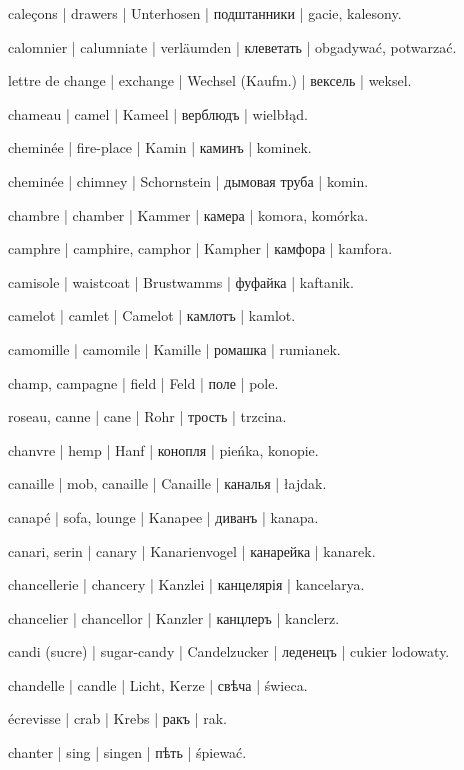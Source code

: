 \begin{outdent}{1em}
caleçons | drawers | Unterhosen | подштанники | gacie,
kalesony.

calomnier | calumniate | verläumden | клеветать | obgadywać, potwarzać.

lettre de change | exchange | Wechsel (Kaufm.) | вексель | weksel.

chameau | camel | Kameel | верблюдъ | wielbłąd.

cheminée | fire-place | Kamin | каминъ | kominek.

\uvsubentry{}
cheminée | chimney | Schornstein | дымовая труба | komin.

chambre | chamber | Kammer | камера | komora, komórka.

camphre | camphire, camphor | Kampher | камфора | kamfora.

camisole | waistcoat | Brustwamms | фуфайка | kaftanik.

camelot | camlet | Camelot | камлотъ | kamlot.

camomille | camomile | Kamille | ромашка | rumianek.

champ, campagne | field | Feld | поле | pole.

roseau, canne | cane | Rohr | трость | trzcina.

chanvre | hemp | Hanf | конопля | pieńka, konopie.

canaille | mob, canaille | Canaille | каналья | łajdak.

canapé | sofa, lounge | Kanapee | диванъ | kanapa.

canari, serin | canary | Kanarienvogel | канарейка | kanarek.

chancellerie | chancery | Kanzlei | канцелярія | kancelarya.

chancelier | chancellor | Kanzler | канцлеръ | kanclerz.

candi (sucre) | sugar-candy | Candelzucker | леденецъ | cukier
lodowaty.

chandelle | candle | Licht, Kerze | свѣча | świeca.

écrevisse | crab | Krebs | ракъ | rak.

chanter | sing | singen | пѣть | śpiewać.


\end{outdent}

